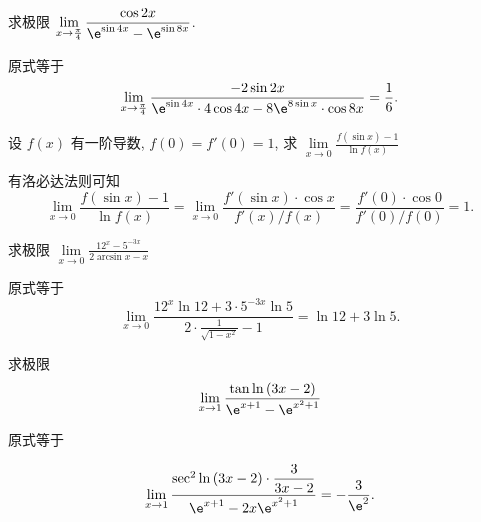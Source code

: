 \begin{problem} 求极限
$\displaystyle \lim\limits_{x \rightarrow \frac{\pi}{4}}\frac{\cos 2x}{\e^{\sin 4x} - \e^{\sin 8x}}$.

\begin{solution} 原式等于
$$\lim\limits_{x \rightarrow \frac{\pi}{4}}\frac{- 2\sin 2x}{\e^{\sin 4x} \cdot 4\cos 4x - 8\e^{8\sin x} \cdot \cos 8x} = \frac{1}{6}.$$

\end{solution}
\end{problem}

\begin{problem} 设 $f(x)$ 有一阶导数,
$f\left( 0 \right) = f'\left( 0 \right) = 1$, 求
$\displaystyle \lim\limits_{x \rightarrow 0}\frac{f\left( \sin x \right) - 1}{\ln f\left( x \right)}$

\begin{solution} 有洛必达法则可知
$$\lim\limits_{x \rightarrow 0}\frac{f\left( \sin x \right) - 1}{\ln f\left( x \right)} = \lim\limits_{x \rightarrow 0}\frac{f'\left( \sin x \right) \cdot \cos x}{f'\left( x \right)\text{/}f\left( x \right)} = \frac{f'\left( 0 \right) \cdot \cos 0}{f'\left( 0 \right)\text{/}f\left( 0 \right)} = 1.$$

\end{solution}
\end{problem}

\begin{problem} 求极限
$\displaystyle \lim\limits_{x \rightarrow 0}\frac{12^{x} - 5^{- 3x}}{ 2\arcsin x - x}$

\begin{solution} 原式等于
$$\lim\limits_{x \rightarrow 0}\frac{12^{x}\ln 12 + 3 \cdot 5^{- 3x}\ln 5}{2 \cdot \displaystyle \frac{1}{\sqrt{1 - x^{2}}} - 1} = \ln 12 + 3\ln 5.$$

\end{solution}
\end{problem}

\begin{problem} 求极限
$$\lim\limits_{x \rightarrow 1}\frac{\tan{\ln\left( 3x - 2 \right)}}{\e^{x + 1} - \e^{x^{2} + 1}}$$

\begin{solution} 原式等于

$$\lim\limits_{x \rightarrow 1}\frac{\sec^{2}{\ln\left( 3x - 2 \right)} \cdot \displaystyle \frac{3}{3x - 2}}{\displaystyle \e^{x + 1} - 2x\e^{x^{2} + 1}} = - \frac{3}{\e^{2}}.$$

\end{solution}
\end{problem}


